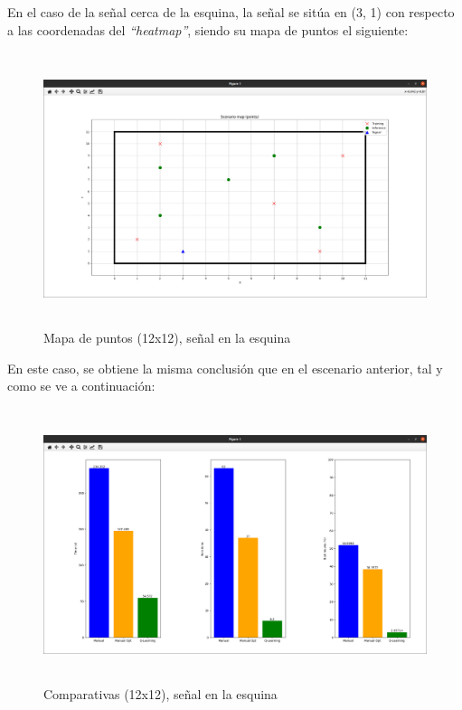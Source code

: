 En el caso de la señal cerca de la esquina, la señal se sitúa en (3, 1) con respecto a las coordenadas del \emph{``heatmap''}, siendo su mapa de puntos el siguiente:

\begin{figure} [H]
    \begin{center}
    \includegraphics[height=8cm]{imagenes/cap4/19_mapa_p_esq_12.png}
    \end{center}
    \caption[Mapa de puntos (12x12), señal en la esquina]{Mapa de puntos (12x12), señal en la esquina}
    \label{fig:map_p_esq_12}
\end{figure}

En este caso, se obtiene la misma conclusión que en el escenario anterior, tal y como se ve a continuación:\\

\begin{figure} [H]
    \begin{center}
    \includegraphics[height=8cm]{imagenes/cap4/20_comp_esq_12.png}
    \end{center}
    \caption[Comparativas (12x12), señal en la esquina]{Comparativas (12x12), señal en la esquina}
    \label{fig:comp_esq_12}
\end{figure}

